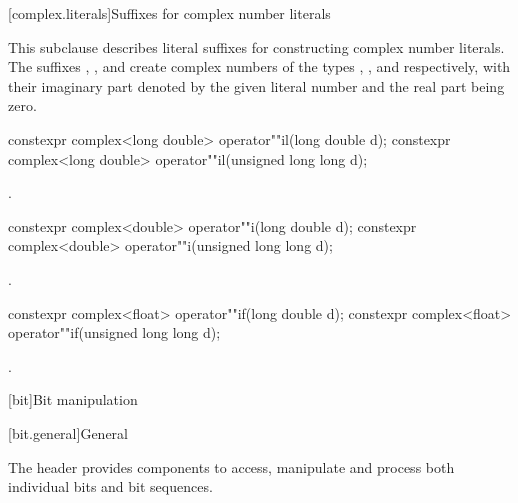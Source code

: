 [complex.literals]{Suffixes for complex number literals}

%
%
\pnum
This subclause describes literal suffixes for constructing complex number literals.
The suffixes , , and  create complex numbers of
the types , , and
 respectively, with their imaginary part denoted by the
given literal number and the real part being zero.

%
\begin{itemdecl}
constexpr complex<long double> operator""il(long double d);
constexpr complex<long double> operator""il(unsigned long long d);
\end{itemdecl}

\begin{itemdescr}
\pnum
\returns
{}.
\end{itemdescr}

%
\begin{itemdecl}
constexpr complex<double> operator""i(long double d);
constexpr complex<double> operator""i(unsigned long long d);
\end{itemdecl}

\begin{itemdescr}
\pnum
\returns
{}.
\end{itemdescr}

%
\begin{itemdecl}
constexpr complex<float> operator""if(long double d);
constexpr complex<float> operator""if(unsigned long long d);
\end{itemdecl}

\begin{itemdescr}
\pnum
\returns
{}.
\end{itemdescr}


[bit]{Bit manipulation}

[bit.general]{General}

\pnum
The header  provides components to access,
manipulate and process both individual bits and bit sequences.


